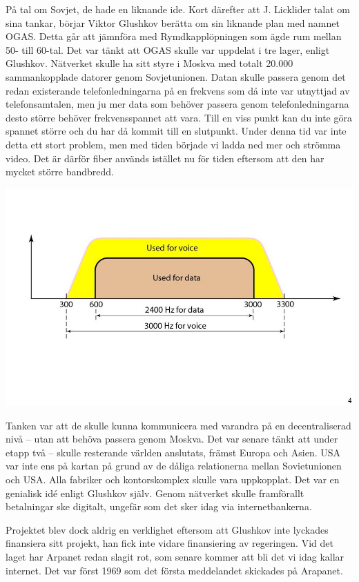 \documentclass[a4paper,11pt]{article}
\begin{document}
På tal om Sovjet, de hade en liknande ide. Kort därefter att J. Licklider talat om sina tankar, börjar Viktor Glushkov berätta om sin liknande plan med namnet OGAS. Detta går att jämnföra med Rymdkapplöpningen som ägde rum mellan 50- till 60-tal. Det var tänkt att OGAS skulle var uppdelat i tre lager, enligt Glushkov. Nätverket skulle ha sitt styre i Moskva med totalt 20.000 sammankopplade datorer genom Sovjetunionen. Datan skulle passera genom det redan existerande telefonledningarna på en frekvens som då inte var utnyttjad av telefonsamtalen, men ju mer data som behöver passera genom telefonledningarna desto större behöver frekvensspannet att vara. Till en viss punkt kan du inte göra spannet större och du har då kommit till en slutpunkt. Under denna tid var inte detta ett stort problem, men med tiden började vi ladda ned mer och strömma video. Det är därför fiber används istället nu för tiden eftersom att den har mycket större bandbredd.

{\centering
\includegraphics[width=1\linewidth]{Bilder/bandbredd.jpg}
} \newpage

Tanken var att de skulle kunna kommunicera med varandra på en decentraliserad nivå -- utan att behöva passera genom Moskva. Det var senare tänkt att under etapp två -- skulle resterande världen anslutats, främst Europa och Asien. USA var inte ens på kartan på grund av de dåliga relationerna mellan Sovietunionen och USA. Alla fabriker och kontorskomplex skulle vara uppkopplat. Det var en genialisk idé enligt Glushkov själv. Genom nätverket skulle framförallt betalningar ske digitalt, ungefär som det sker idag via internetbankerna.

Projektet blev dock aldrig en verklighet eftersom att Glushkov inte lyckades finansiera sitt projekt, han fick inte vidare finansiering av regeringen. Vid det laget har Arpanet redan slagit rot, som senare kommer att bli det vi idag kallar internet. Det var först 1969 som det första meddelandet skickades på Arapanet.
\end{document}
